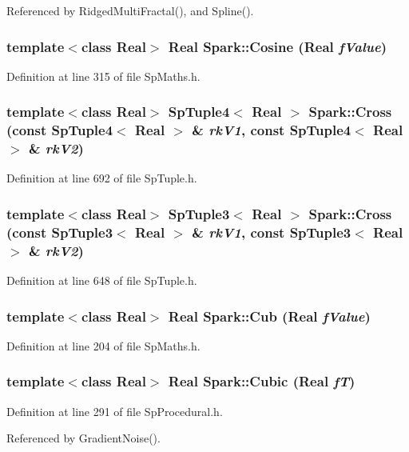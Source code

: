 Referenced by Ridged\-Multi\-Fractal(), and Spline().
\subsubsection{\setlength{\rightskip}{0pt plus 5cm}template$<$class Real$>$ Real Spark::Cosine (Real {\em f\-Value})}\label{namespaceSpark_a65}


Definition at line 315 of file Sp\-Maths.h.
\subsubsection{\setlength{\rightskip}{0pt plus 5cm}template$<$class Real$>$ {\bf Sp\-Tuple4}$<$ Real $>$ Spark::Cross (const Sp\-Tuple4$<$ Real $>$ \& {\em rk\-V1}, const Sp\-Tuple4$<$ Real $>$ \& {\em rk\-V2})}\label{namespaceSpark_a130}


Definition at line 692 of file Sp\-Tuple.h.
\subsubsection{\setlength{\rightskip}{0pt plus 5cm}template$<$class Real$>$ {\bf Sp\-Tuple3}$<$ Real $>$ Spark::Cross (const Sp\-Tuple3$<$ Real $>$ \& {\em rk\-V1}, const Sp\-Tuple3$<$ Real $>$ \& {\em rk\-V2})}\label{namespaceSpark_a127}


Definition at line 648 of file Sp\-Tuple.h.
\subsubsection{\setlength{\rightskip}{0pt plus 5cm}template$<$class Real$>$ Real Spark::Cub (Real {\em f\-Value})}\label{namespaceSpark_a48}


Definition at line 204 of file Sp\-Maths.h.
\subsubsection{\setlength{\rightskip}{0pt plus 5cm}template$<$class Real$>$ Real Spark::Cubic (Real {\em f\-T})}\label{namespaceSpark_a98}


Definition at line 291 of file Sp\-Procedural.h.

Referenced by Gradient\-Noise().
